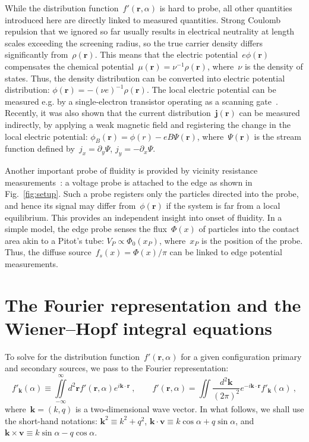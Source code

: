 \documentclass[preprint,aps,eqsecnum, prb]{revtex4-1}
\begin{document}
While the distribution
function~$f'({\bm r}, \alpha)$ is hard to probe, all other quantities
introduced here are directly linked to measured quantities.
Strong Coulomb repulsion
that we ignored so far usually  results in electrical neutrality
at length scales exceeding the screening radius, so the true carrier
density differs significantly from~$\rho({\bm r})$. This means that
the electric potential~$e\phi({\bm r})$ compensates the chemical
potential~$\mu({\bm r}) = \nu^{-1} \rho({\bm r})$, where~$\nu$
is the density of states. Thus, the density distribution can be converted
into electric
potential distribution: $\phi({\bm r}) = - (\nu e)^{-1} \rho({\bm r})$.
The local electric potential can be measured e.g. by a single-electron
transistor operating as a scanning gate~\cite{bib:Ilani}. Recently, it was
also shown\cite{bib:Measuring-Psi}
that the current distribution~${\bm j}({\bm r})$
can be measured indirectly, by applying
a weak magnetic field and registering the change in the local electric
potential: $\phi_B({\bm r}) = \phi(r) - eB \Psi({\bm r})$,
where~$\Psi({\bm r})$ is the stream function defined
by~$j_x = \partial_y \Psi$, $j_y= -\partial_x \Psi$.

Another important probe of fluidity is provided by
vicinity resistance measurements~\cite{bib:Bandurin, bib:Ensslin}:
a voltage probe is attached to the edge as shown in
Fig.~\ref{fig:setup}. Such a probe
registers only the particles directed into the probe, and hence
its signal may differ from~$\phi({\bm r})$ if the system is far from a
local equilibrium.  This provides an
independent insight into onset of fluidity. In a simple model, the
edge probe senses the flux~$\Phi(x)$ of particles into the contact area
akin to a Pitot's tube:
$V_P \propto \Phi_0(x_P)$, where~$x_P$ is the position of the probe.
Thus, the diffuse source~$f_s(x) = \Phi(x)/\pi$ can be linked to edge
potential measurements.


\section{The Fourier representation and the Wiener--Hopf integral equations}
\label{sec:fourier-wh}
To solve for the distribution function~$f'({\bm r}, \alpha)$ for a given configuration primary and
secondary sources,  we pass to the Fourier representation:
\begin{equation}
  \label{eq:fourier-definition}
  f'_{\bm k}(\alpha) \equiv \iint\limits_{-\infty}^{\infty}
   d^2{\bm r} f'({\bm r}, \alpha)
  e^{i {\bm k} \cdot{\bm r}}
  \ ,
  \qquad
  f'({\bm r}, \alpha) =
  \iint \frac{d^2 {\bm k}}{(2\pi)^2} e^{-i {\bm k}\cdot{\bm r}} f'_{\bm k}(\alpha)
  \ ,
\end{equation}
where~${\bm k} = (k, q)$ is a two-dimensional wave vector. In what follows,
we shall use the short-hand notations: ${\bm k}^2 \equiv k^2 + q^2$,
${\bm k}\cdot{\bm v} \equiv k \cos \alpha + q \sin\alpha$,
and~${\bm k}\times{\bm v} \equiv k \sin\alpha - q \cos\alpha$.
\end{document}

